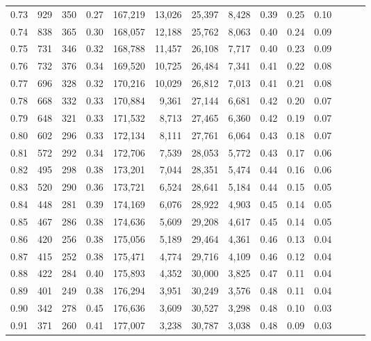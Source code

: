 \begin{tabular}{rrrrrrrrrrrrrr}
0.73 &    929 &    350 &  0.27 &  167,219 &   13,026 &  25,397 &   8,428 &  0.39 &  0.25 &      0.10 \\
0.74 &    838 &    365 &  0.30 &  168,057 &   12,188 &  25,762 &   8,063 &  0.40 &  0.24 &      0.09 \\
0.75 &    731 &    346 &  0.32 &  168,788 &   11,457 &  26,108 &   7,717 &  0.40 &  0.23 &      0.09 \\
0.76 &    732 &    376 &  0.34 &  169,520 &   10,725 &  26,484 &   7,341 &  0.41 &  0.22 &      0.08 \\
0.77 &    696 &    328 &  0.32 &  170,216 &   10,029 &  26,812 &   7,013 &  0.41 &  0.21 &      0.08 \\
0.78 &    668 &    332 &  0.33 &  170,884 &    9,361 &  27,144 &   6,681 &  0.42 &  0.20 &      0.07 \\
0.79 &    648 &    321 &  0.33 &  171,532 &    8,713 &  27,465 &   6,360 &  0.42 &  0.19 &      0.07 \\
0.80 &    602 &    296 &  0.33 &  172,134 &    8,111 &  27,761 &   6,064 &  0.43 &  0.18 &      0.07 \\
0.81 &    572 &    292 &  0.34 &  172,706 &    7,539 &  28,053 &   5,772 &  0.43 &  0.17 &      0.06 \\
0.82 &    495 &    298 &  0.38 &  173,201 &    7,044 &  28,351 &   5,474 &  0.44 &  0.16 &      0.06 \\
0.83 &    520 &    290 &  0.36 &  173,721 &    6,524 &  28,641 &   5,184 &  0.44 &  0.15 &      0.05 \\
0.84 &    448 &    281 &  0.39 &  174,169 &    6,076 &  28,922 &   4,903 &  0.45 &  0.14 &      0.05 \\
0.85 &    467 &    286 &  0.38 &  174,636 &    5,609 &  29,208 &   4,617 &  0.45 &  0.14 &      0.05 \\
0.86 &    420 &    256 &  0.38 &  175,056 &    5,189 &  29,464 &   4,361 &  0.46 &  0.13 &      0.04 \\
0.87 &    415 &    252 &  0.38 &  175,471 &    4,774 &  29,716 &   4,109 &  0.46 &  0.12 &      0.04 \\
0.88 &    422 &    284 &  0.40 &  175,893 &    4,352 &  30,000 &   3,825 &  0.47 &  0.11 &      0.04 \\
0.89 &    401 &    249 &  0.38 &  176,294 &    3,951 &  30,249 &   3,576 &  0.48 &  0.11 &      0.04 \\
0.90 &    342 &    278 &  0.45 &  176,636 &    3,609 &  30,527 &   3,298 &  0.48 &  0.10 &      0.03 \\
0.91 &    371 &    260 &  0.41 &  177,007 &    3,238 &  30,787 &   3,038 &  0.48 &  0.09 &      0.03 \\

\end{tabular}
